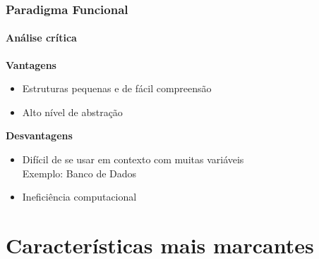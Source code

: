 \documentclass[aspectratio=169]{beamer}
\begin{document}
    \begin{frame}
      \frametitle{Paradigma Funcional}
      \framesubtitle{Análise crítica}

      \pause

      \textbf{Vantagens} 
      \begin{itemize}
        \item Estruturas pequenas e de fácil compreensão \pause 
        \item Alto nível de abstração \pause 
      \end{itemize}

      \textbf{Desvantagens} 
      \begin{itemize}
        \item Difícil de se usar em contexto com muitas variáveis
        \\ Exemplo: Banco de Dados \pause  
        \item Ineficiência computacional 
      \end{itemize}
       
    \end{frame}


    \nocite{haskellslides}
    \nocite{funcoespura}
    \nocite{funcoespura2}
    \nocite{haskellwikipedia}
    \nocite{paradigmas}



    \section{Características mais marcantes}
\end{document}
